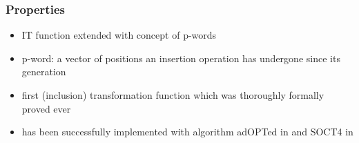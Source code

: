 \subsubsection{Properties}
\begin{itemize}
 \item IT function extended with concept of p-words
 \item p-word: a vector of positions an insertion operation has undergone since its generation
 \item first (inclusion) transformation function which was thoroughly formally proved ever
 \item has been successfully implemented with algorithm adOPTed in \cite{cicolini} and SOCT4 in \cite{mosi}
\end{itemize}
